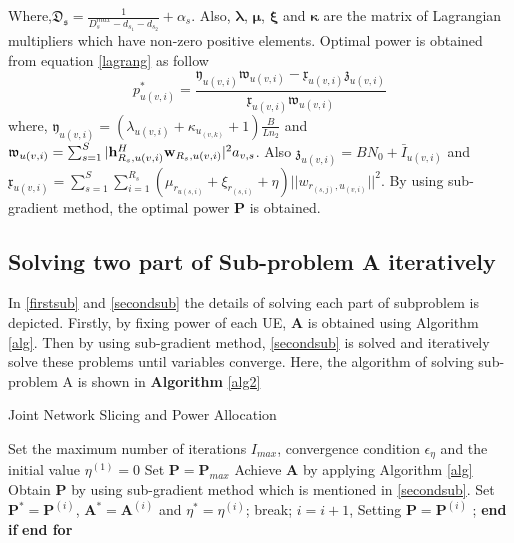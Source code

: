 \documentclass[conference]{IEEEtran}
\begin{document}
Where,$\mathfrak{D_s}=\frac{1}{D_{s}^{max}-d_{s_1}-d_{s_2}}+\alpha_s$. Also, $\boldsymbol{\lambda}$, $\boldsymbol{\mu}$, $\boldsymbol{\xi}$ and $\boldsymbol{ \kappa}$ are the matrix of Lagrangian multipliers which have non-zero positive elements. Optimal power is obtained from equation \eqref{lagrang} as follow
\begin{equation}
p_{u(v,i)}^{*} = \frac{\mathfrak{y}_{u(v,i)}\mathfrak{w}_{u(v,i)}-\mathfrak{x}_{u(v,i)}\mathfrak{z}_{u(v,i)}}{\mathfrak{x}_{u(v,i)}\mathfrak{w}_{u(v,i)} }
\end{equation}
where, $\mathfrak{y}_{u(v,i)}= (\lambda_{u(v,i)}+\kappa_{u_{(v,k)}}+1)\frac{B}{Ln_2}$ and 
$\mathfrak{w}_{u(v,i)} = \sum_{s=1}^{S}|\bold{h}_{R_s,u(v,i)}^H \bold{w}_{R_s,u(v,i)}|^2 a_{v,s}$. Also 
$\mathfrak{z}_{u(v,i)} = BN_0 + \bar{I}_{u(v,i)}$ and $\mathfrak{x}_{u(v,i)} = \sum\limits_{s=1}^{S} \sum\limits_{i=1}^{R_s} ( \mu_{r_{u(s,i)}} + \xi_{r_{(s,i)}}+\eta)||w_{r_{(s,j)},u_{(v,i)}}||^2$. 
By using sub-gradient method, the optimal power $\boldsymbol{P}$ is obtained. 
\subsection{Solving two part of Sub-problem A iteratively}
In \eqref{firstsub} and \eqref{secondsub} the details of solving each part of subproblem is depicted. 
Firstly, by fixing power of each UE, $\boldsymbol{A}$ is obtained using Algorithm \eqref{alg}. Then by using sub-gradient method, \eqref{secondsub} is solved and iteratively solve these problems until variables converge.
Here, the algorithm of solving sub-problem A is shown in \textbf{Algorithm} \eqref{alg2}
\begin{algorithm}
\caption{Joint Network Slicing and Power Allocation}\label{alg2}
\begin{algorithmic}[1]
\State Set the maximum number of iterations $I_{max}$, convergence condition $\epsilon_{\eta}$  and the initial value $\eta^{(1)} = 0$
\State Set $\boldsymbol{P} = \boldsymbol{P}_{max}$
\State Achieve $\boldsymbol{A}$ by applying Algorithm \eqref{alg}
\State Obtain $\boldsymbol{P}$ by using sub-gradient method which is mentioned in \eqref{secondsub}.
\State Set $\boldsymbol{P}^*= \boldsymbol{P}^{(i)} $, $\boldsymbol{A}^*= \boldsymbol{A}^{(i)} $   and  $ \eta^{*} =\eta^{(i)} $;
\State break;
\Else
\State $i= i+1$, Setting $\boldsymbol{P} = \boldsymbol{P}^{(i)}$ ;
\EndIf 
\State \textbf{end if}
\EndFor 
\State \textbf{end for}
\end{algorithmic}
\end{algorithm}
\end{document}
